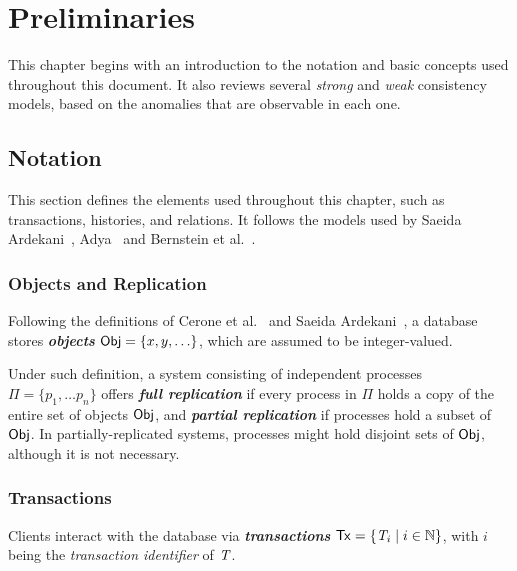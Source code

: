 \cleardoublepage
\chapter{Preliminaries}
\label{chapter:preliminaries}

This chapter begins with an introduction to the notation and basic concepts used throughout this document. It also reviews several \emph{strong} and \emph{weak} consistency models, based on the anomalies that are observable in each one.

\section{Notation}
\label{sect:notation}

This section defines the elements used throughout this chapter, such as transactions, histories, and relations. It follows the models used by Saeida Ardekani~\citep{ardekani_thesis}, Adya~\citep{adya_thesis} and Bernstein et al.~\citep{bernstein_concurrency}.

\subsection{Objects and Replication}
\label{sect:objects}

Following the definitions of Cerone et al.~\citep{concur_framework} and Saeida Ardekani~\citep{ardekani_thesis}, a database stores \textbf{\em objects} ${\sf Obj} = \{x, y, \ldots\}$, which are assumed to be integer-valued.

Under such definition, a system consisting of independent processes $\Pi = \{p_1, \ldots p_n\}$ offers \textbf{\em full replication} if every process in $\Pi$ holds a copy of the entire set of objects ${\sf Obj}$, and \textbf{\em partial replication} if processes hold a subset of ${\sf Obj}$. In partially-replicated systems, processes might hold disjoint sets of ${\sf Obj}$, although it is not necessary.

\subsection{Transactions}
\label{sect:transactions}

Clients interact with the database via \textbf{\em transactions} ${\sf Tx} = \{\mathit{T}_i \mid i \in \mathbb{N}\}$, with $i$ being the \emph{transaction identifier} of $\mathit{T}$.

